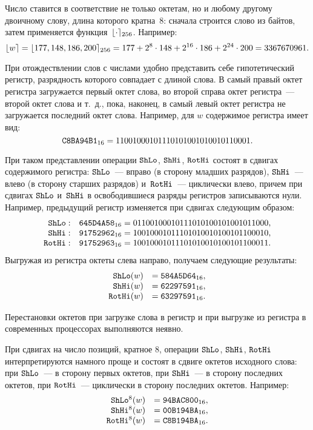 Число ставится в соответствие не только октетам, но и любому другому
двоичному слову, длина которого кратна~$8$:
сначала строится слово из байтов, затем применяется функция~$\lfloor\cdot\rceil_{256}$.
%
Например:
$$
\lfloor w\rceil=\lfloor177,148,186,200\rceil_{256}=177+2^{8}\cdot 148+2^{16}\cdot 
186+2^{24}\cdot 200 = 3367670961. 
$$

При отождествлении слов с числами удобно представить себе 
гипотетический регистр, разрядность которого совпадает с длиной слова.
В самый правый октет регистра загружается первый октет слова, 
во второй справа октет регистра~--- второй октет слова и т.~д.,
пока, наконец, в самый левый октет регистра не загружается последний 
октет слова.
%
Например, для $w$ содержимое регистра имеет 
вид:
$$
\texttt{C8BA94B1}_{16}=
11001000 10111010 10010100 10110001.
$$

При таком представлении операции $\mathop{\texttt{ShLo}}\nolimits$, $\mathop{\texttt{ShHi}}\nolimits$, $\mathop{\texttt{RotHi}}\nolimits$ состоят в
сдвигах содержимого регистра: 
$\mathop{\texttt{ShLo}}\nolimits$~--- вправо (в сторону младших разрядов),
$\mathop{\texttt{ShHi}}\nolimits$~--- влево (в сторону старших разрядов)
и~$\mathop{\texttt{RotHi}}\nolimits$~--- циклически влево,
причем при сдвигах $\mathop{\texttt{ShLo}}\nolimits$ и~$\mathop{\texttt{ShHi}}\nolimits$ в освободившиеся разряды 
регистров записываются нули.
%
Например, предыдущий регистр изменяется при сдвигах следующим образом:
$$      
\begin{array}{rl}
\mathop{\texttt{ShLo}}\nolimits: &\texttt{645D4A58}_{16}=
0 1100100 0 1011101 0 1001010 0 1011000,\\
\mathop{\texttt{ShHi}}\nolimits: &\texttt{91752962}_{16}= 
1001000 1 0111010 1 0010100 1 0110001 0,\\
\mathop{\texttt{RotHi}}\nolimits: &\texttt{91752963}_{16}=
1001000 1 0111010 1 0010100 1 0110001 1.
\end{array}
$$
Выгружая из регистра октеты слева направо, 
получаем следующие результаты:
$$
\begin{array}{rl}
\mathop{\texttt{ShLo}}\nolimits(w)&=  \texttt{584A5D64}_{16},\\
\mathop{\texttt{ShHi}}\nolimits(w)&=  \texttt{62297591}_{16},\\
\mathop{\texttt{RotHi}}\nolimits(w)&= \texttt{63297591}_{16}.
\end{array}
$$

Перестановки октетов при загрузке слова в регистр и при выгрузке из 
регистра в современных процессорах выполняются неявно.

При сдвигах на число позиций, кратное $8$, операции $\mathop{\texttt{ShLo}}\nolimits$, $\mathop{\texttt{ShHi}}\nolimits$, $\mathop{\texttt{RotHi}}\nolimits$
интерпретируются намного проще и состоят в сдвиге октетов исходного слова: 
при $\mathop{\texttt{ShLo}}\nolimits$~--- в сторону первых октетов, 
при $\mathop{\texttt{ShHi}}\nolimits$~--- в сторону последних октетов,
при $\mathop{\texttt{RotHi}}\nolimits$~--- циклически в сторону последних октетов.
Например:
$$
\begin{array}{rl}
\mathop{\texttt{ShLo}}\nolimits^8(w)&=  \texttt{94BAC800}_{16},\\
\mathop{\texttt{ShHi}}\nolimits^8(w)&=  \texttt{00B194BA}_{16},\\
\mathop{\texttt{RotHi}}\nolimits^8(w)&= \texttt{C8B194BA}_{16}.
\end{array}
$$

